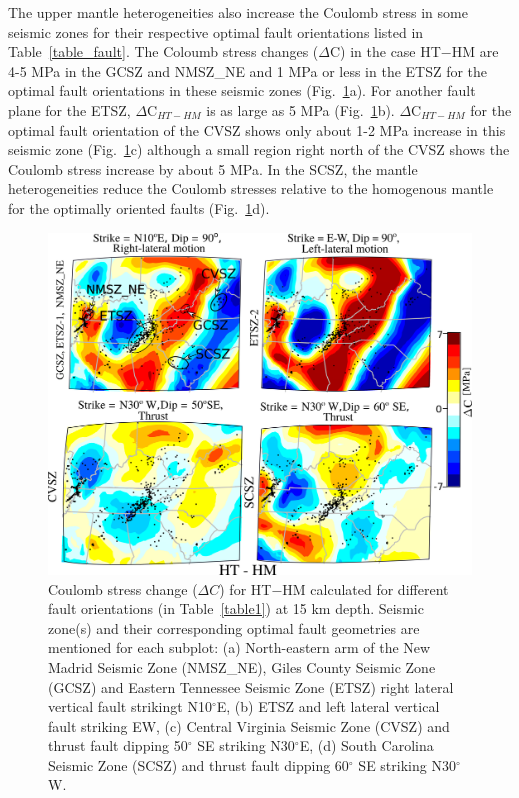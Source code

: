 \documentclass[draft,linenumbers]{agujournal2018}
\begin{document}
The upper mantle heterogeneities also increase the Coulomb stress in some seismic zones for their respective optimal fault orientations listed in Table~\ref{table_fault}. The Coloumb stress changes ($\Delta$C) in the case HT$-$HM
are 4-5 MPa in the GCSZ and NMSZ\_NE and 1 MPa or less in the ETSZ for the optimal fault orientations in these seismic zones (Fig.~\ref{ht_hm_cs}a). For another fault plane for the ETSZ, $\Delta$C$_{HT-HM}$ is as large as 5 MPa  (Fig.~\ref{ht_hm_cs}b). $\Delta$C$_{HT-HM}$ for the optimal fault orientation of the CVSZ shows only about 1-2 MPa increase in this seismic zone (Fig.~\ref{ht_hm_cs}c) although a small region right north of the CVSZ shows the Coulomb stress increase by about 5 MPa. In the SCSZ, the mantle heterogeneities reduce the Coulomb stresses relative to the homogenous mantle for the optimally oriented faults (Fig.~\ref{ht_hm_cs}d). 
%
\begin{figure}[h!]
    \centering
    \includegraphics[width=0.75\linewidth]{figures/cs_ht_hm.png}
    \caption{Coulomb stress change ($\Delta C$) for HT$-$HM calculated for different fault orientations (in Table~\ref{table1}) at 15 km depth. Seismic zone(s) and their corresponding optimal fault geometries are mentioned for each subplot: (a) North-eastern arm of the New Madrid Seismic Zone (NMSZ\_NE), Giles County Seismic Zone (GCSZ) and Eastern Tennessee Seismic Zone (ETSZ) right lateral vertical fault strikingt N10$^\circ$E, (b) ETSZ and left lateral vertical fault striking EW, (c) Central Virginia Seismic Zone (CVSZ) and thrust fault dipping 50$^\circ$ SE striking N30$^\circ$E, (d) South Carolina Seismic Zone (SCSZ) and thrust fault dipping 60$^\circ$ SE striking N30$^\circ$W.}
    \label{ht_hm_cs}
\end{figure}
\end{document}
